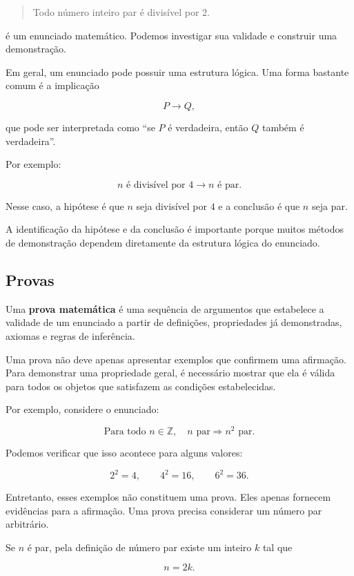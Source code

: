 \documentclass[
  brazilian,
  letterpaper,
]{book}
\theoremstyle{plain}
\theoremstyle{definition}
\theoremstyle{remark}
\begin{document}
\begin{quote}
Todo número inteiro par é divisível por 2.
\end{quote}

é um enunciado matemático. Podemos investigar sua validade e construir
uma demonstração.

Em geral, um enunciado pode possuir uma estrutura lógica. Uma forma
bastante comum é a implicação

\[
P\rightarrow Q,
\]

que pode ser interpretada como ``se \(P\) é verdadeira, então \(Q\)
também é verdadeira''.

Por exemplo:

\[
n\text{ é divisível por }4
\rightarrow
n\text{ é par}.
\]

Nesse caso, a hipótese é que \(n\) seja divisível por \(4\) e a
conclusão é que \(n\) seja par.

A identificação da hipótese e da conclusão é importante porque muitos
métodos de demonstração dependem diretamente da estrutura lógica do
enunciado.

\subsection{Provas}\label{provas}

Uma \textbf{prova matemática} é uma sequência de argumentos que
estabelece a validade de um enunciado a partir de definições,
propriedades já demonstradas, axiomas e regras de inferência.

Uma prova não deve apenas apresentar exemplos que confirmem uma
afirmação. Para demonstrar uma propriedade geral, é necessário mostrar
que ela é válida para todos os objetos que satisfazem as condições
estabelecidas.

Por exemplo, considere o enunciado:

\[
\text{Para todo }n\in\mathbb{Z},\quad
n\text{ par}\Rightarrow n^2\text{ par}.
\]

Podemos verificar que isso acontece para alguns valores:

\[
2^2=4,
\qquad
4^2=16,
\qquad
6^2=36.
\]

Entretanto, esses exemplos não constituem uma prova. Eles apenas
fornecem evidências para a afirmação. Uma prova precisa considerar um
número par arbitrário.

Se \(n\) é par, pela definição de número par existe um inteiro \(k\) tal
que

\[
n=2k.
\]
\end{document}
